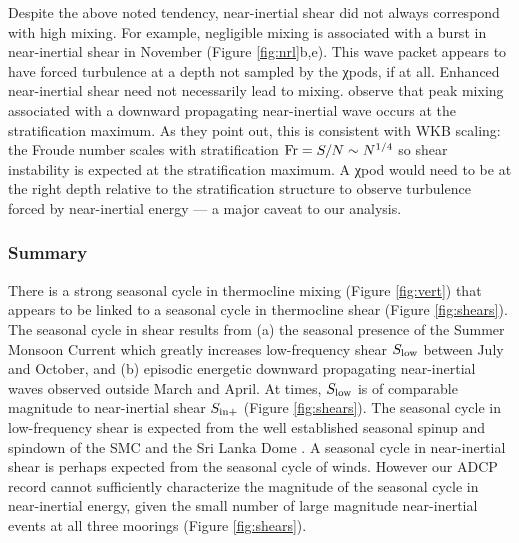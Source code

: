 \documentclass[onecol]{ametsoc}
\begin{document}
Despite the above noted tendency, near-inertial shear did not always correspond with high mixing. For example, negligible mixing is associated with a burst in near-inertial shear in November (Figure \ref{fig:nrl}b,e). This wave packet appears to have forced turbulence at a depth not sampled by the χpods, if at all. Enhanced near-inertial shear need not necessarily lead to mixing. \cite{Alford2001b} observe that peak mixing associated with a downward propagating near-inertial wave occurs at the stratification maximum. As they point out, this is consistent with WKB scaling: the Froude number scales with stratification \(\textnormal{Fr} = S/N \sim N^{1/4}\) so shear instability is expected at the stratification maximum. A χpod would need to be at the right depth relative to the stratification structure to observe turbulence forced by near-inertial energy --- a major caveat to our analysis.


\subsubsection*{Summary}
\label{sec:org78d8996}

There is a strong seasonal cycle in thermocline mixing (Figure \ref{fig:vert}) that appears to be linked to a seasonal cycle in thermocline shear (Figure \ref{fig:shears}).
The seasonal cycle in shear results from
(a) the seasonal presence of the Summer Monsoon Current which greatly increases low-frequency shear \(S_\text{low}\) between July and October, and
(b) episodic energetic downward propagating near-inertial waves observed outside March and April.
At times, \(S_\text{low}\) is of comparable magnitude to near-inertial shear \(S_\text{in+}\) (Figure \ref{fig:shears}).
The seasonal cycle in low-frequency shear is expected from the well established seasonal spinup and spindown of the SMC and the Sri Lanka Dome \citep{Schott2001a, Vinayachandran1998}.
A seasonal cycle in near-inertial shear is perhaps expected from the seasonal cycle of winds.
However our ADCP record cannot sufficiently characterize the magnitude of the seasonal cycle in near-inertial energy, given the small number of large magnitude near-inertial events at all three moorings (Figure \ref{fig:shears}).
\end{document}
